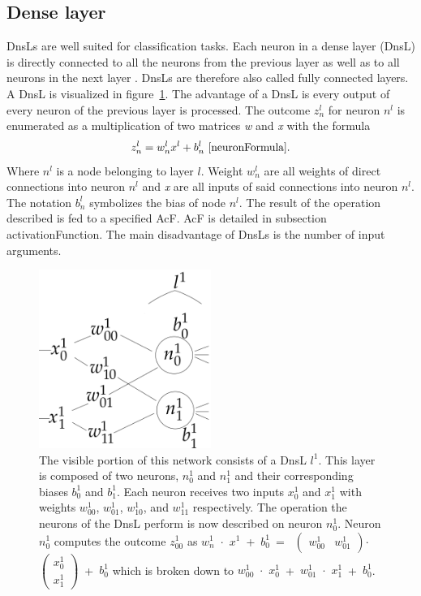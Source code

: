 \subsection{Dense layer}\label{denseLayers}
DnsLs are well suited for classification tasks. Each neuron in a dense layer (DnsL) is directly connected to all the neurons from the previous layer as well as to all neurons in the next layer \cite{CNN}. DnsLs are therefore also called fully connected layers. A DnsL is visualized in figure~\ref{denseLayerVisualization}. The advantage of a DnsL is every output of every neuron of the previous layer is processed. The outcome ${z^l_n}$ for neuron ${n^l}$  is enumerated as a multiplication of two matrices \textit{w} and \textit{x} with the formula \[{z^l_{n}}=w^l_n  x^l + b^l_n~\cite{neuronFormula}\text{.}\] Where ${n^l}$ is a node belonging to layer ${l}$. Weight ${w^l_n}$ are all weights of direct connections into neuron ${n^l}$ and \textit{x} are all inputs of said connections into neuron ${n^l}$. The notation ${b^l_n}$ symbolizes the bias of node ${n^l}$. The result of the operation described is fed to a specified AcF. AcF is detailed in subsection {activationFunction}. The main disadvantage of DnsLs is the number of input arguments.
\begin{figure}
  \includegraphics[width=0.5\textwidth]{Images/denseLayer.png}
  \caption[rightcaption]{The visible portion of this network consists of a DnsL ${l^1}$. This layer is composed of two neurons, ${n^1_0}$ and ${n^1_1}$ and their corresponding biases ${b^1_0}$ and ${b^1_1}$. Each neuron receives two inputs ${x^1_{0}}$ and ${x^1_{1}}$ with weights ${w^1_{00}}$, ${w^1_{01}}$, ${w^1_{10}}$, and ${w^1_{11}}$ respectively. The operation the neurons of the DnsL perform is now described on neuron ${n^1_{0}}$. Neuron ${n^1_{0}}$ computes the outcome ${z^1_{00}}$ as 
${w^1_{n}}$~$\cdot$~${x^1}$~+~${b^1_0}$~=~
 $\left(\begin{smallmatrix}{w^1_{00}}&{w^1_{01}}\end{smallmatrix}\right)$$\cdot$$\left(\begin{smallmatrix}{x^1_{0}}\\{x^1_{1}}\end{smallmatrix}\right)$~+~${b^1_0}$
which is broken down to ${w^1_{00}}$~$\cdot$~${x^1_{0}}$~+~${w^1_{01}}$~$\cdot$~${x^1_{1}}$~+~${b^1_0}$.
}
  \label{denseLayerVisualization}
\end{figure} 

